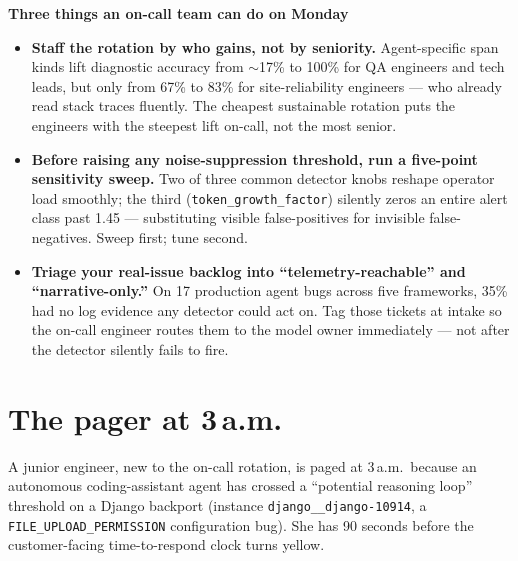 \documentclass[journal]{IEEEtran}
\begin{document}
\begin{mdframed}[backgroundcolor=black!5,linecolor=black!50,linewidth=0.5pt,roundcorner=4pt,skipabove=6pt,skipbelow=6pt]
\noindent\textbf{Three things an on-call team can do on Monday}
\begin{itemize}[leftmargin=*,nosep]
\item \textbf{Staff the rotation by who gains, not by seniority.} Agent-specific span kinds lift diagnostic accuracy from $\sim$17\% to 100\% for QA engineers and tech leads, but only from 67\% to 83\% for site-reliability engineers --- who already read stack traces fluently. The cheapest sustainable rotation puts the engineers with the steepest lift on-call, not the most senior.
\item \textbf{Before raising any noise-suppression threshold, run a five-point sensitivity sweep.} Two of three common detector knobs reshape operator load smoothly; the third (\texttt{token\_growth\_factor}) silently zeros an entire alert class past 1.45 --- substituting visible false-positives for invisible false-negatives. Sweep first; tune second.
\item \textbf{Triage your real-issue backlog into ``telemetry-reachable'' and ``narrative-only.''} On 17 production agent bugs across five frameworks, 35\% had no log evidence any detector could act on. Tag those tickets at intake so the on-call engineer routes them to the model owner immediately --- not after the detector silently fails to fire.
\end{itemize}
\end{mdframed}

\section{The pager at 3\,a.m.}

A junior engineer, new to the on-call rotation, is paged at 3\,a.m.\ because an autonomous coding-assistant agent has crossed a ``potential reasoning loop'' threshold on a Django backport (instance \texttt{django\_\_django-10914}, a \texttt{FILE\_UPLOAD\_PERMISSION} configuration bug). She has 90 seconds before the customer-facing time-to-respond clock turns yellow.
\end{document}
